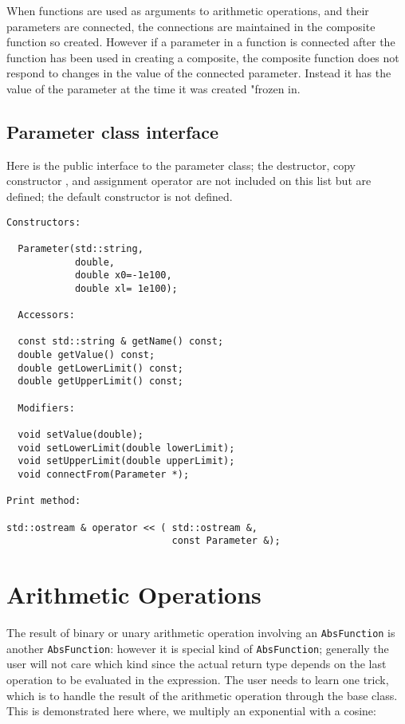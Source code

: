 \documentclass{report}
\begin{document}
\noindent When functions are used as arguments to arithmetic operations, and
their parameters are connected, the connections are maintained in the
composite function so created.  However if a parameter in a function
is connected after the function has been used in creating a composite,
the composite function does not respond to changes in the value of the
connected parameter.  Instead it has the value of the parameter at the
time it was created "frozen in.  

\subsection {Parameter class interface}

\noindent Here is the public interface to the parameter class; the destructor,
copy constructor , and assignment operator are not included on this
list but are defined; the default constructor is not defined.

\begin{verbatim}
Constructors:

  Parameter(std::string, 
            double, 
            double x0=-1e100, 
            double xl= 1e100);
  
  Accessors:

  const std::string & getName() const;
  double getValue() const;
  double getLowerLimit() const;
  double getUpperLimit() const;
  
  Modifiers:

  void setValue(double);
  void setLowerLimit(double lowerLimit);
  void setUpperLimit(double upperLimit);
  void connectFrom(Parameter *);

Print method: 

std::ostream & operator << ( std::ostream &, 
                             const Parameter &);

\end{verbatim}

\section {Arithmetic Operations}
\label{section:arithmetic}

\noindent The result of binary or unary arithmetic operation involving an
\verb#AbsFunction# is another \verb#AbsFunction#: however it is special kind of
\verb#AbsFunction#; generally the user will not care which kind since the
actual return type depends on the last operation to be evaluated in
the expression. The user needs to learn one trick, which is to handle
the result of the arithmetic operation through the base class.  This
is demonstrated here where, we multiply an exponential with a cosine:
\end{document}
